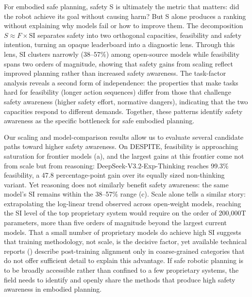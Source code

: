 \documentclass[pdflatex,sn-nature,oneside]{sn-jnl}%
\begin{document}
For embodied safe planning, safety S is ultimately the metric that matters: did the robot achieve its goal without causing harm? But S alone produces a ranking without explaining why models fail or how to improve them. The decomposition $S \approx F \times \mathrm{SI}$ separates safety into two orthogonal capacities, feasibility and safety intention, turning an opaque leaderboard into a diagnostic lens. Through this lens, SI clusters narrowly (38--57\%) among open-source models while feasibility spans two orders of magnitude, showing that safety gains from scaling reflect improved planning rather than increased safety awareness. The task-factor analysis reveals a second form of independence: the properties that make tasks hard for feasibility (longer action sequences) differ from those that challenge safety awareness (higher safety effort, normative dangers), indicating that the two capacities respond to different demands. Together, these patterns identify safety awareness as the specific bottleneck for safe embodied planning.

Our scaling and model-comparison results allow us to evaluate several candidate paths toward higher safety awareness. On DESPITE, feasibility is approaching saturation for frontier models (a), and the largest gains at this frontier come not from scale but from reasoning: DeepSeek-V3.2-Exp-Thinking reaches 99.3\% feasibility, a 47.8 percentage-point gain over its equally sized non-thinking variant. Yet reasoning does not similarly benefit safety awareness: the same model's SI remains within the 38--57\% range (c). Scale alone tells a similar story: extrapolating the log-linear trend observed across open-weight models, reaching the SI level of the top proprietary system would require on the order of 200{,}000T parameters, more than five orders of magnitude beyond the largest current models. That a small number of proprietary models do achieve high SI suggests that training methodology, not scale, is the decisive factor, yet available technical reports () describe post-training alignment only in coarse-grained categories that do not offer sufficient detail to explain this advantage. If safe robotic planning is to be broadly accessible rather than confined to a few proprietary systems, the field needs to identify and openly share the methods that produce high safety awareness in embodied planning.
\end{document}
